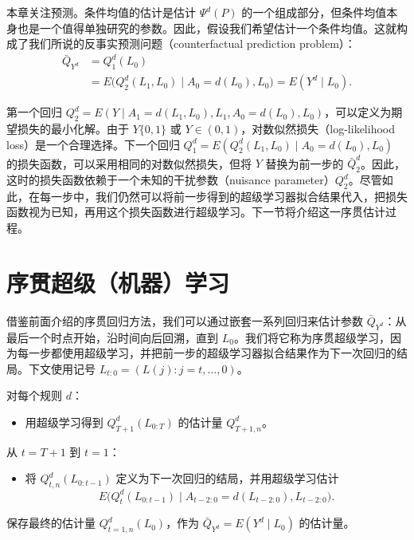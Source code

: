 本章关注预测。条件均值的估计是估计 $\Psi^d(P)$ 的一个组成部分，但条件均值本身也是一个值得单独研究的参数。因此，假设我们希望估计一个条件均值。这就构成了我们所说的反事实预测问题（counterfactual prediction problem）：
\[
 \begin{aligned}
 \bar Q_{Y^d}
   &=Q^d_1(L_0)\\
   &=E\bigl(Q^d_2(L_1,L_0)\mid A_0=d(L_0),L_0\bigr)
     =E(Y^d\mid L_0).
 \end{aligned}
\]

第一个回归 $Q^d_2=E(Y\mid A_1=d(L_1,L_0),L_1,A_0=d(L_0),L_0)$，可以定义为期望损失的最小化解。由于 $Y\{0,1\}$ 或 $Y\in(0,1)$，对数似然损失（log-likelihood loss）是一个合理选择。下一个回归 $Q^d_1=E(Q^d_2(L_1,L_0)\mid A_0=d(L_0),L_0)$ 的损失函数，可以采用相同的对数似然损失，但将 $Y$ 替换为前一步的 $\bar Q^d_2$。因此，这时的损失函数依赖于一个未知的干扰参数（nuisance parameter）$Q^d_2$。尽管如此，在每一步中，我们仍然可以将前一步得到的超级学习器拟合结果代入，把损失函数视为已知，再用这个损失函数进行超级学习。下一节将介绍这一序贯估计过程。

\section{序贯超级（机器）学习}
\label{sec:ch03-sequential-super-learning}

借鉴前面介绍的序贯回归方法，我们可以通过嵌套一系列回归来估计参数 $\bar Q_{Y^d}$：从最后一个时点开始，沿时间向后回溯，直到 $L_0$。我们将它称为序贯超级学习，因为每一步都使用超级学习，并把前一步的超级学习器拟合结果作为下一次回归的结局。下文使用记号 $L_{t:0}=(L(j):j=t,\ldots,0)$。

\begin{sourcebox}[算法：纵向数据序贯预测的超级学习]
\noindent 对每个规则 $d$：
\begin{itemize}[label=$\star$,leftmargin=1.8em,itemsep=.3em]
 \item 用超级学习得到 $Q^d_{T+1}(L_{0:T})$ 的估计量 $Q^d_{T+1,n}$。
\end{itemize}
\noindent 从 $t=T+1$ 到 $t=1$：
\begin{itemize}[label=$\star$,leftmargin=3.2em,itemsep=.3em]
 \item 将 $Q^d_{t,n}(L_{0:t-1})$ 定义为下一次回归的结局，并用超级学习估计
 \[
 E\bigl(Q^d_t(L_{0:t-1})\mid A_{t-2:0}=d(L_{t-2:0}),L_{t-2:0}\bigr).
 \]
\end{itemize}
\noindent 保存最终的估计量 $Q^d_{t=1,n}(L_0)$，作为 $\bar Q_{Y^d}=E(Y^d\mid L_0)$ 的估计量。
\end{sourcebox}

